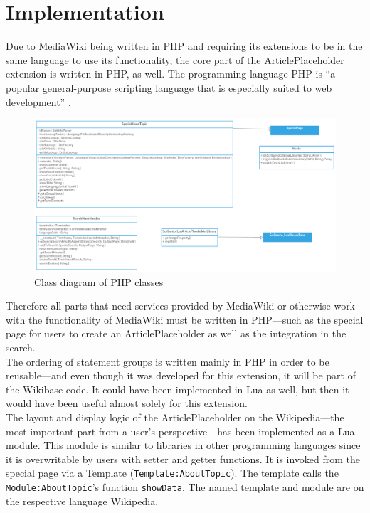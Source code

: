 \chapter{Implementation}
	
	Due to MediaWiki being written in PHP and requiring its extensions to be in the same language to use its functionality, the core part of the ArticlePlaceholder extension is written in PHP, as well. The programming language PHP is ``a popular general-purpose scripting language that is especially suited to web development'' \citep{php:01}. \\
	\begin{figure}[H]
		\centering
		\includegraphics[width=\textwidth]{diagrams/ArticlePlaceholderClassDiagram.png}
		\caption{Class diagram of PHP classes}
		\label{fig:ClassDiagramPHP}
	\end{figure}
	Therefore all parts that need services provided by MediaWiki or otherwise work with the functionality of MediaWiki must be written in PHP---such as the special page for users to create an ArticlePlaceholder as well as the integration in the search. \\
	The ordering of statement groups is written mainly in PHP in order to be reusable---and even though it was developed for this extension, it will be part of the Wikibase code. It could have been implemented in Lua as well, but then it would have been useful almost solely for this extension. \\
	The layout and display logic of the ArticlePlaceholder on the Wikipedia---the most important part from a user's perspective---has been implemented as a Lua module. This module is similar to libraries in other programming languages since it is overwritable by users with setter and getter functions. It is invoked from the special page via a Template (\texttt{\justify Template:AboutTopic}). The template calls the \texttt{\justify Module:AboutTopic}'s function \texttt{\justify showData}. The named template and module are on the respective language Wikipedia. \\
	
	
	
	
	
	
	
	
	
	